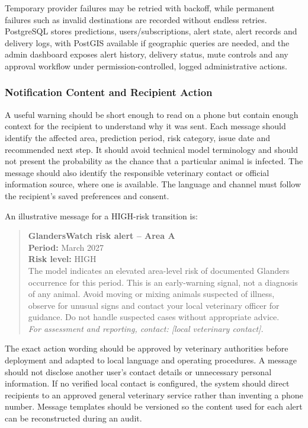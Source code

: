 \documentclass[10pt,openany]{report}
\begin{document}
Temporary provider failures may be retried with backoff, while permanent failures such as invalid destinations are recorded without endless retries. PostgreSQL stores predictions, users/subscriptions, alert state, alert records and delivery logs, with PostGIS available if geographic queries are needed, and the admin dashboard exposes alert history, delivery status, mute controls and any approval workflow under permission-controlled, logged administrative actions.

\subsubsection{Notification Content and Recipient Action}
A useful warning should be short enough to read on a phone but contain enough context for the recipient to understand why it was sent. Each message should identify the affected area, prediction period, risk category, issue date and recommended next step. It should avoid technical model terminology and should not present the probability as the chance that a particular animal is infected. The message should also identify the responsible veterinary contact or official information source, where one is available. The language and channel must follow the recipient's saved preferences and consent.

An illustrative message for a HIGH-risk transition is:
\begin{quote}\small
\textbf{GlandersWatch risk alert -- Area A}\\
\textbf{Period:} March 2027\\
\textbf{Risk level:} HIGH\\
The model indicates an elevated area-level risk of documented Glanders occurrence for this period. This is an early-warning signal, not a diagnosis of any animal. Avoid moving or mixing animals suspected of illness, observe for unusual signs and contact your local veterinary officer for guidance. Do not handle suspected cases without appropriate advice.\\
\textit{For assessment and reporting, contact: [local veterinary contact].}
\end{quote}
The exact action wording should be approved by veterinary authorities before deployment and adapted to local language and operating procedures. A message should not disclose another user's contact details or unnecessary personal information. If no verified local contact is configured, the system should direct recipients to an approved general veterinary service rather than inventing a phone number. Message templates should be versioned so the content used for each alert can be reconstructed during an audit.
\end{document}
